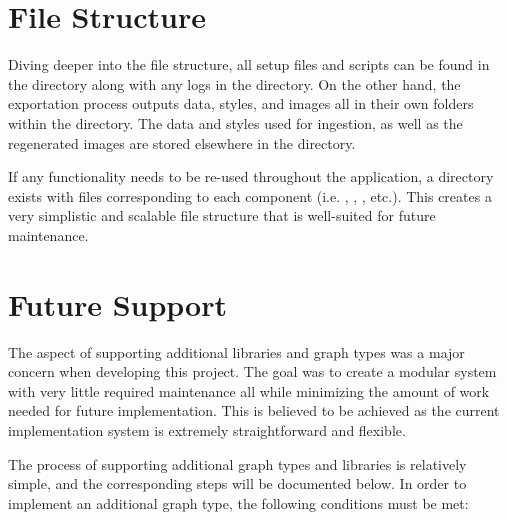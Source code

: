 \section{File Structure}
Diving deeper into the file structure, all setup files and scripts can be found in the  directory along with any logs in the  directory. On the other hand, the exportation process outputs data, styles, and images all in their own folders within the  directory. The data and styles used for ingestion, as well as the regenerated images are stored elsewhere in the  directory.

\hfill

If any functionality needs to be re-used throughout the application, a  directory exists with files corresponding to each component (i.e. , , , etc.). This creates a very simplistic and scalable file structure that is well-suited for future maintenance.

\section{Future Support}
The aspect of supporting additional libraries and graph types was a major concern when developing this project. The goal was to create a modular system with very little required maintenance all while minimizing the amount of work needed for future implementation. This is believed to be achieved as the current implementation system is extremely straightforward and flexible.

\hfill

The process of supporting additional graph types and libraries is relatively simple, and the corresponding steps will be documented below. In order to implement an additional graph type, the following conditions must be met:

